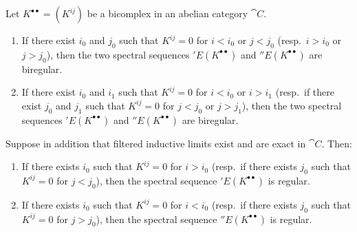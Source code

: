 \begin{proposition}[11.3.3]
\label{0.11.3.3}
Let $K^{\bullet\bullet}=(K^{ij})$ be a bicomplex in an abelian category $\cat{C}$.
\begin{enumerate}
  \item[{\rm(i)}] If there exist $i_0$ and $j_0$ such that $K^{ij}=0$ for $i<i_0$ or $j<j_0$ (resp.~$i>i_0$ or $j>j_0$), then the two spectral sequences $'E(K^{\bullet\bullet})$ and $''E(K^{\bullet\bullet})$ are biregular.
  \item[{\rm(ii)}] If there exist $i_0$ and $i_1$ such that $K^{ij}=0$ for $i<i_0$ or $i>i_1$ (resp.~if there exist $j_0$ and $j_1$ such that $K^{ij}=0$ for $j<j_0$ or $j>j_1$), then the two spectral sequences $'E(K^{\bullet\bullet})$ and $''E(K^{\bullet\bullet})$ are biregular.
\end{enumerate}
Suppose in addition that filtered inductive limits exist and are exact in $\cat{C}$. Then:
\begin{enumerate}
  \item[{\rm(iii)}] If there exists $i_0$ such that $K^{ij}=0$ for $i>i_0$ (resp.~if there exists $j_0$ such that $K^{ij}=0$ for $j<j_0$), then the spectral sequence $'E(K^{\bullet\bullet})$ is regular.
  \item[{\rm(iv)}] If there exists $i_0$ such that $K^{ij}=0$ for $i<i_0$ (resp.~if there exists $j_0$ such that $K^{ij}=0$ for $j>j_0$), then the spectral sequence $''E(K^{\bullet\bullet})$ is regular.
\end{enumerate}
\end{proposition}

